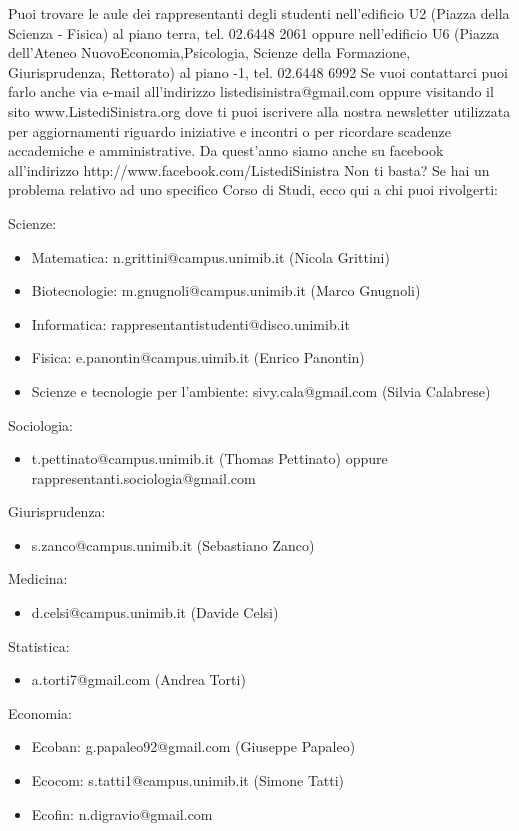 Puoi trovare le aule dei rappresentanti degli studenti  nell'edificio U2 (Piazza della Scienza - Fisica) al piano terra, tel. 02.6448 2061 oppure nell'edificio U6 (Piazza dell'Ateneo NuovoEconomia,Psicologia, Scienze della Formazione, Giurisprudenza, Rettorato) al piano -1, tel. 02.6448 6992
Se vuoi contattarci puoi farlo anche via e-mail all’indirizzo listedisinistra@gmail.com oppure visitando il sito www.ListediSinistra.org dove ti puoi iscrivere alla nostra newsletter utilizzata per aggiornamenti riguardo iniziative e incontri o per ricordare scadenze accademiche e amministrative.
Da quest'anno siamo anche su facebook all'indirizzo http://www.facebook.com/ListediSinistra 
Non ti basta? Se hai un problema relativo ad uno specifico Corso di Studi, ecco qui a chi puoi rivolgerti:

Scienze:
\begin{itemize}
\item Matematica: 
n.grittini@campus.unimib.it (Nicola Grittini)
\item Biotecnologie: 
m.gnugnoli@campus.unimib.it (Marco Gnugnoli)
\item Informatica: rappresentantistudenti@disco.unimib.it
\item Fisica: e.panontin@campus.uimib.it (Enrico Panontin)
\item Scienze e tecnologie per l'ambiente: sivy.cala@gmail.com (Silvia Calabrese)
\end{itemize}   
Sociologia: 
\begin{itemize}
\item t.pettinato@campus.unimib.it (Thomas Pettinato) oppure rappresentanti.sociologia@gmail.com
\end{itemize}
Giurisprudenza:
\begin{itemize}
\item s.zanco@campus.unimib.it (Sebastiano Zanco)
\end{itemize}   
Medicina: 
\begin{itemize}
\item d.celsi@campus.unimib.it (Davide Celsi)
\end{itemize}   
Statistica: 
\begin{itemize}
\item a.torti7@gmail.com (Andrea Torti)
\end{itemize}
Economia: 
\begin{itemize}
\item Ecoban: g.papaleo92@gmail.com (Giuseppe Papaleo)
\item Ecocom: s.tatti1@campus.unimib.it (Simone Tatti)
\item Ecofin: n.digravio@gmail.com
\end{itemize}
